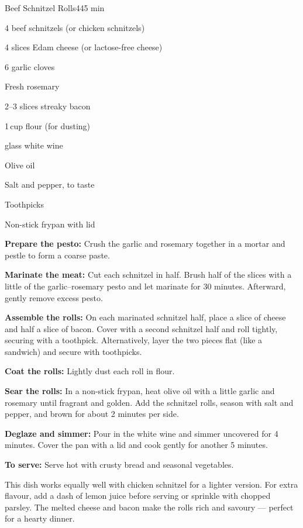 \begin{recipebox}{Beef Schnitzel Rolls}{4}{45 min}
  \begin{ingredients}
    \item 4 beef schnitzels (or chicken schnitzels)
    \item 4 slices Edam cheese (or lactose-free cheese)
    \item 6 garlic cloves
    \item Fresh rosemary
    \item 2--3 slices streaky bacon
    \item 1\,cup flour (for dusting)
    \item {} glass white wine
    \item Olive oil
    \item Salt and pepper, to taste
    \item Toothpicks
    \item Non-stick frypan with lid
  \end{ingredients}

  \begin{method}
    \item \textbf{Prepare the pesto:} Crush the garlic and rosemary together in a mortar and pestle to form a coarse paste.
    \item \textbf{Marinate the meat:} Cut each schnitzel in half. Brush half of the slices with a little of the garlic–rosemary pesto and let marinate for 30 minutes. Afterward, gently remove excess pesto.
    \item \textbf{Assemble the rolls:} On each marinated schnitzel half, place a slice of cheese and half a slice of bacon. Cover with a second schnitzel half and roll tightly, securing with a toothpick.  
    Alternatively, layer the two pieces flat (like a sandwich) and secure with toothpicks.
    \item \textbf{Coat the rolls:} Lightly dust each roll in flour.
    \item \textbf{Sear the rolls:} In a non-stick frypan, heat olive oil with a little garlic and rosemary until fragrant and golden. Add the schnitzel rolls, season with salt and pepper, and brown for about 2 minutes per side.
    \item \textbf{Deglaze and simmer:} Pour in the white wine and simmer uncovered for 4 minutes. Cover the pan with a lid and cook gently for another 5 minutes.
    \item \textbf{To serve:} Serve hot with crusty bread and seasonal vegetables.
  \end{method}

  \begin{notes}
    This dish works equally well with chicken schnitzel for a lighter version.  
    For extra flavour, add a dash of lemon juice before serving or sprinkle with chopped parsley.  
    The melted cheese and bacon make the rolls rich and savoury — perfect for a hearty dinner.
  \end{notes}
\end{recipebox}
